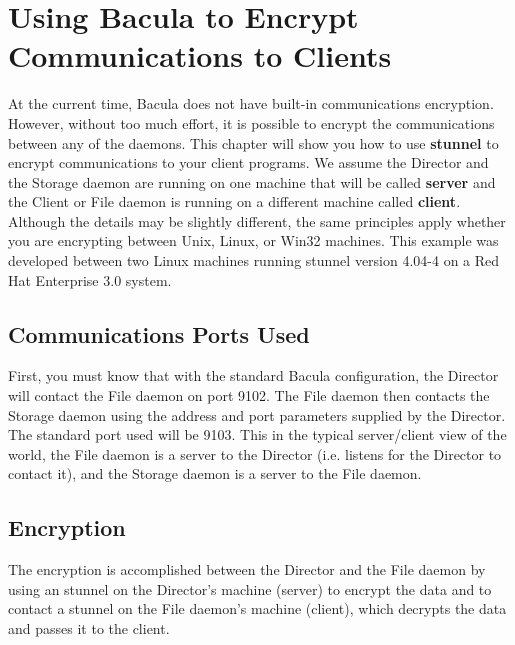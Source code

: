 
\section*{Using Bacula to Encrypt Communications to Clients}
\label{_ChapterStart6}

At the current time, Bacula does not have built-in communications encryption.
However, without too much effort, it is possible to encrypt the communications
between any of the daemons. This chapter will show you how to use {\bf
stunnel} to encrypt communications to your client programs. We assume the
Director and the Storage daemon are running on one machine that will be called
{\bf server} and the Client or File daemon is running on a different machine
called {\bf client}. Although the details may be slightly different, the same
principles apply whether you are encrypting between Unix, Linux, or Win32
machines. This example was developed between two Linux machines running
stunnel version 4.04-4 on a Red Hat Enterprise 3.0 system. 

\subsection*{Communications Ports Used}

First, you must know that with the standard Bacula configuration, the Director
will contact the File daemon on port 9102. The File daemon then contacts the
Storage daemon using the address and port parameters supplied by the Director.
The standard port used will be 9103. This in the typical server/client view of
the world, the File daemon is a server to the Director (i.e. listens for the
Director to contact it), and the Storage daemon is a server to the File
daemon. 

\subsection*{Encryption}

The encryption is accomplished between the Director and the File daemon by
using an stunnel on the Director's machine (server) to encrypt the data and to
contact a stunnel on the File daemon's machine (client), which decrypts the
data and passes it to the client. 

